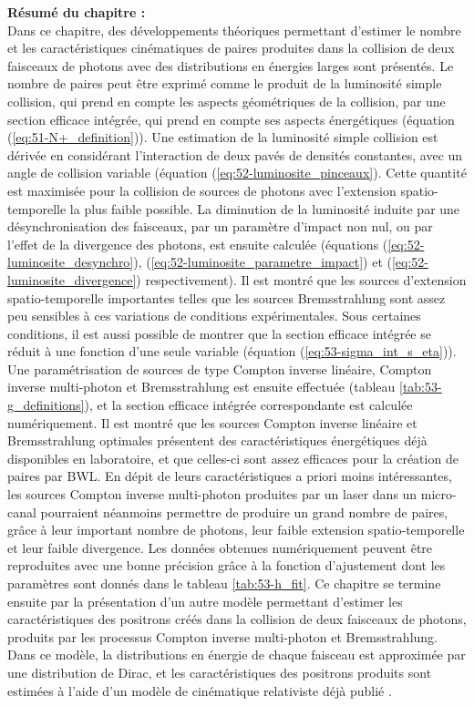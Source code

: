 \begin{refsection}
{\begin{minipage}{\textwidth}
    \medskip
    \textbf{Résumé du chapitre :}\\
    Dans ce chapitre, des développements théoriques permettant d'estimer le nombre et les caractéristiques cinématiques de paires produites dans la collision de deux faisceaux de photons avec des distributions en énergies larges sont présentés. Le nombre de paires peut être exprimé comme le produit de la luminosité simple collision, qui prend en compte les aspects géométriques de la collision, par une section efficace intégrée, qui prend en compte ses aspects énergétiques (équation (\ref{eq:51-N+_definition})). Une estimation de la luminosité simple collision est dérivée en considérant l'interaction de deux pavés de densités constantes, avec un angle de collision variable (équation (\ref{eq:52-luminosite_pinceaux}). Cette quantité est maximisée pour la collision de sources de photons avec l'extension spatio-temporelle la plus faible possible. La diminution de la luminosité induite par une désynchronisation des faisceaux, par un paramètre d'impact non nul, ou par l'effet de la divergence des photons, est ensuite calculée (équations (\ref{eq:52-luminosite_desynchro}), (\ref{eq:52-luminosite_parametre_impact}) et (\ref{eq:52-luminosite_divergence}) respectivement). Il est montré que les sources d'extension spatio-temporelle importantes telles que les sources Bremsstrahlung sont assez peu sensibles à ces variations de conditions expérimentales. Sous certaines conditions, il est aussi possible de montrer que la section efficace intégrée se réduit à une fonction d'une seule variable (équation (\ref{eq:53-sigma_int_s_eta})). Une paramétrisation de sources de type Compton inverse linéaire, Compton inverse multi-photon et Bremsstrahlung est ensuite effectuée (tableau \ref{tab:53-g_definitions}), et la section efficace intégrée correspondante est calculée numériquement. Il est montré que les sources Compton inverse linéaire et Bremsstrahlung optimales présentent des caractéristiques énergétiques déjà disponibles en laboratoire, et que celles-ci sont assez efficaces pour la création de paires par BWL. En dépit de leurs caractéristiques a priori moins intéressantes, les sources Compton inverse multi-photon produites par un laser dans un micro-canal pourraient néanmoins permettre de produire un grand nombre de paires, grâce à leur important nombre de photons, leur faible extension spatio-temporelle et leur faible divergence. Les données obtenues numériquement peuvent être reproduites avec une bonne précision grâce à la fonction d'ajustement dont les paramètres sont donnés dans le tableau \ref{tab:53-h_fit}. Ce chapitre se termine ensuite par la présentation d'un autre modèle permettant d'estimer les caractéristiques des positrons créés dans la collision de deux faisceaux de photons, produits par les processus Compton inverse multi-photon et Bremsstrahlung. Dans ce modèle, la distributions en énergie de chaque faisceau est approximée par une distribution de Dirac, et les caractéristiques des positrons produits sont estimées à l'aide d'un modèle de cinématique relativiste déjà publié \parencite{ribeyre_2017}. 
    

\end{minipage}}
\end{refsection}
